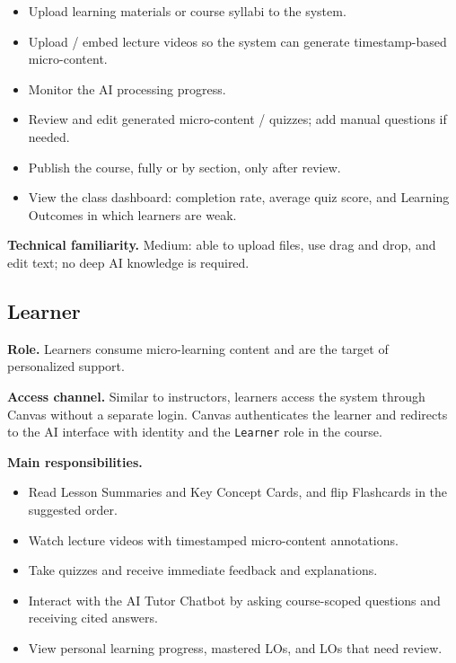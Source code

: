 \begin{itemize}
    \item Upload learning materials or course syllabi to the system.
    \item Upload / embed lecture videos so the system can generate
          timestamp-based micro-content.
    \item Monitor the AI processing progress.
    \item Review and edit generated micro-content / quizzes; add manual
          questions if needed.
    \item Publish the course, fully or by section, only after review.
    \item View the class dashboard: completion rate, average quiz score, and
          Learning Outcomes in which learners are weak.
\end{itemize}

\textbf{Technical familiarity.} Medium: able to upload files, use drag and
drop, and edit text; no deep AI knowledge is required.

\subsection{Learner}

\textbf{Role.} Learners consume micro-learning content and are the target of
personalized support.

\textbf{Access channel.} Similar to instructors, learners access the system
through Canvas without a separate login. Canvas authenticates the learner and
redirects to the AI interface with identity and the \texttt{Learner} role in
the course.

\textbf{Main responsibilities.}

\begin{itemize}
    \item Read Lesson Summaries and Key Concept Cards, and flip Flashcards in
          the suggested order.
    \item Watch lecture videos with timestamped micro-content annotations.
    \item Take quizzes and receive immediate feedback and explanations.
    \item Interact with the AI Tutor Chatbot by asking course-scoped questions
          and receiving cited answers.
    \item View personal learning progress, mastered LOs, and LOs that need
          review.
\end{itemize}

